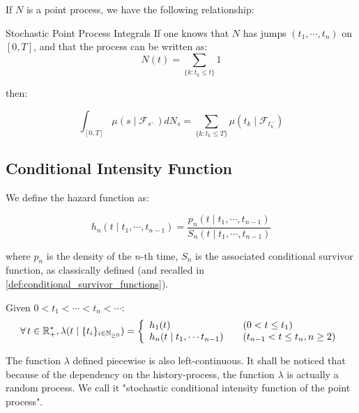 If $N$ is a point process, we have the following relationship:

\begin{theoreme}[label = eq:sum_prod_equiv]{Stochastic Point Process Integrals}
If one knows that $N$ has jumps $(t_1, \cdots, t_n)$ on $[0,T]$, and that the process can be written as:
\begin{equation}
N(t) = \sum_{ \{ k : t_k \leq t \} } 1 
\end{equation}

then:

\begin{equation}
\int_{[0,T]} \mu(s \mid \mathcal F_{s^-} ) d N_s = \sum_{ \{ k : t_k \leq T \} }\mu(t_k \mid \mathcal F_{t_k^-} ) 
\end{equation}  
\end{theoreme}


\subsection{Conditional Intensity Function}
We define the hazard function as:

$$h_n( t \mid t_1, \cdots, t_{n-1} ) = \frac{ p_n ( t \mid t_1, \cdots, t_{n-1} ) } { S_n ( t \mid t_1, \cdots, t_{n-1} ) }$$

where $p_n$ is the density of the $n$-th time, $S_n$ is the associated conditional survivor function, as classically defined (and recalled in \ref{def:conditional_survivor_functions}).


\begin{definition}
\label{def:lambda_1}
Given $0 < t_1 < \cdots < t_{n} < \cdots $:
\begin{equation}
\forall t \in \R_+^*, \lambda(t \mid \sequence{ t_i } ) = \left\{
    \begin{array}{ll}
            h_1(t) \quad & (0 < t \leq t_1) \\
            h_n(t \mid t_1, \cdots t_{n-1}) \quad & (t_{n-1} < t \leq t_n, n \geq 2) \\
    \end{array}
\right. 
\end{equation}

The function $\lambda$ defined piecewise is also left-continuous. It shall be noticed that because of the dependency on the history-process, the function $\lambda$ is actually a random process. We call it "stochastic conditional intensity function of the point process". 
\end{definition}

